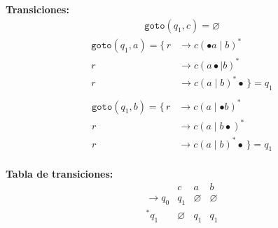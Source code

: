 \documentclass[12pt,letterpaper]{article}
\begin{document}
\begin{enumerate}[label=\arabic*.]
\begin{enumerate}[label=\alph*.]
  \textbf{Transiciones:}
  \[
  \begin{aligned}
    \texttt{goto}(q_1, c) = \varnothing
  \end{aligned}
  \]
  \[
  \begin{aligned}
    \texttt{goto}(q_1, a) =
    \{\,
    r &\to c(\bullet a \mid b)^* \\
    r &\to c(a \bullet \mid b)^* \\
    r &\to c(a \mid b)^*\bullet
    \,\} = q_1 \\
  \end{aligned}
  \]
  \[
  \begin{aligned}
    \texttt{goto}(q_1, b) =
    \{\,
    r &\to c(a \mid \bullet b)^* \\
    r &\to c(a \mid b \bullet)^* \\
    r &\to c(a \mid b)^*\bullet
    \,\} = q_1\\
  \end{aligned}
  \]

  \medskip
  
  \textbf{Tabla de transiciones:}
  \[
  \begin{array}{c|ccc}
    & c & a & b \\ \hline
    \rightarrow q_0 & q_1 & \varnothing & \varnothing \\
                {}^*q_1 & \varnothing & q_1 & q_1 \\
  \end{array}
  \]
  
\end{enumerate}

\end{enumerate}
\end{document}
